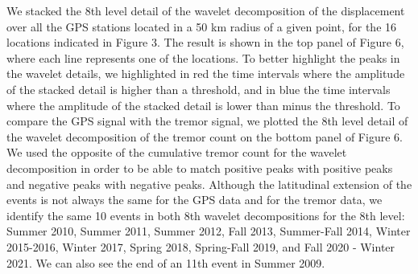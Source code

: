 \documentclass[draft]{agujournal2018}
\begin{document}
We stacked the 8th level detail of the wavelet decomposition of the displacement over all the GPS stations located in a 50 km radius of a given point, for the 16 locations indicated in Figure 3. The result is shown in the top panel of Figure 6, where each line represents one of the locations. To better highlight the peaks in the wavelet details, we highlighted in red the time intervals where the amplitude of the stacked detail is higher than a threshold, and in blue the  time intervals where the amplitude of the stacked detail is lower than minus the threshold. To compare the GPS signal with the tremor signal, we plotted the 8th level detail of the wavelet decomposition of the tremor count on the bottom panel of Figure 6. We used the opposite of the cumulative tremor count for the wavelet decomposition in order to be able to match positive peaks with positive peaks and negative peaks with negative peaks. Although the latitudinal extension of the events is not always the same for the GPS data and for the tremor data, we identify the same 10 events in both 8th wavelet decompositions for the 8th level: Summer 2010, Summer 2011, Summer 2012, Fall 2013, Summer-Fall 2014, Winter 2015-2016, Winter 2017, Spring 2018, Spring-Fall 2019, and Fall 2020 - Winter 2021. We can also see the end of an 11th event in Summer 2009. \\
\end{document}
